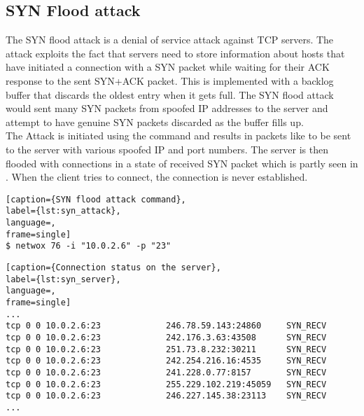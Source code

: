 \subsection{SYN Flood attack}
The SYN flood attack is a denial of service attack against TCP servers. The attack exploits the fact that servers need to store information about hosts that have initiated a connection with a SYN packet while waiting for their ACK response to the sent SYN+ACK packet. This is implemented with a backlog buffer that discards the oldest entry when it gets full. The SYN flood attack would sent many SYN packets from spoofed IP addresses to the server and attempt to have genuine SYN packets discarded as the buffer fills up. \\
The Attack is initiated using the command  and results in packets like  to be sent to the server with various spoofed IP and port numbers. The server is then flooded with connections in a state of received SYN packet which is partly seen in . When the client tries to connect, the connection is never established.

\begin{minipage}{\linewidth}
\begin{lstlisting}[caption={SYN flood attack command},
label={lst:syn_attack},
language=,
frame=single]
$ netwox 76 -i "10.0.2.6" -p "23"
\end{lstlisting}
\end{minipage}

\begin{minipage}{\linewidth}
\begin{lstlisting}[caption={Connection status on the server},
label={lst:syn_server},
language=,
frame=single]
...
tcp 0 0 10.0.2.6:23             246.78.59.143:24860     SYN_RECV   
tcp 0 0 10.0.2.6:23             242.176.3.63:43508      SYN_RECV   
tcp 0 0 10.0.2.6:23             251.73.8.232:30211      SYN_RECV   
tcp 0 0 10.0.2.6:23             242.254.216.16:4535     SYN_RECV   
tcp 0 0 10.0.2.6:23             241.228.0.77:8157       SYN_RECV   
tcp 0 0 10.0.2.6:23             255.229.102.219:45059   SYN_RECV   
tcp 0 0 10.0.2.6:23             246.227.145.38:23113    SYN_RECV 
...
\end{lstlisting}
\end{minipage} 

